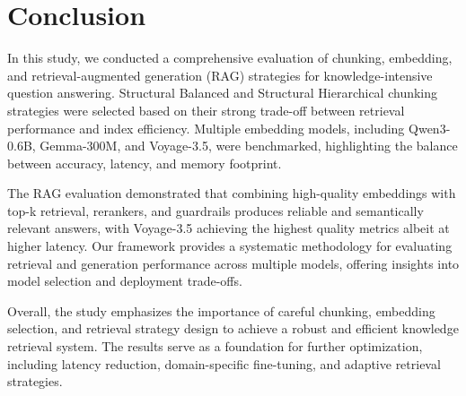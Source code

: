 \section{Conclusion}

In this study, we conducted a comprehensive evaluation of chunking, embedding, and retrieval-augmented generation (RAG) strategies for knowledge-intensive question answering. Structural Balanced and Structural Hierarchical chunking strategies were selected based on their strong trade-off between retrieval performance and index efficiency. Multiple embedding models, including Qwen3-0.6B, Gemma-300M, and Voyage-3.5, were benchmarked, highlighting the balance between accuracy, latency, and memory footprint.

The RAG evaluation demonstrated that combining high-quality embeddings with top-k retrieval, rerankers, and guardrails produces reliable and semantically relevant answers, with Voyage-3.5 achieving the highest quality metrics albeit at higher latency. Our framework provides a systematic methodology for evaluating retrieval and generation performance across multiple models, offering insights into model selection and deployment trade-offs.

Overall, the study emphasizes the importance of careful chunking, embedding selection, and retrieval strategy design to achieve a robust and efficient knowledge retrieval system. The results serve as a foundation for further optimization, including latency reduction, domain-specific fine-tuning, and adaptive retrieval strategies.